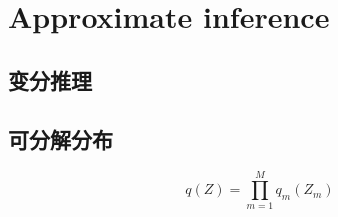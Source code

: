 \chapter{Approximate inference}
\section{变分推理}
\section{可分解分布}
\begin{equation}
q(Z) = \prod_{m=1}^Mq_m(Z_m)
\end{equation}

